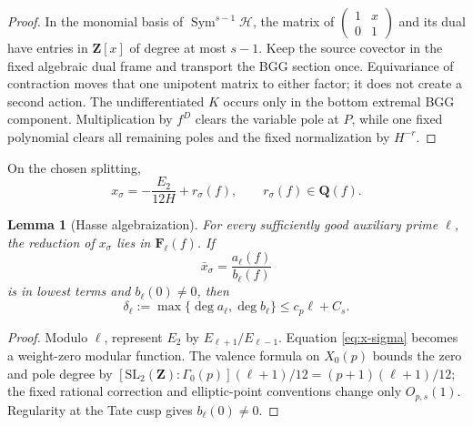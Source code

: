 \documentclass[11pt]{article}
\newtheorem{lemma}[lemma]{Lemma}
\theoremstyle{definition}
\theoremstyle{remark}
\newcommand{\Q}{\mathbf Q}
\newcommand{\Z}{\mathbf Z}
\newcommand{\F}{\mathbf F}
\newcommand{\Sym}{\operatorname{Sym}}
\newcommand{\calH}{\mathcal H}
\begin{document}
\begin{proof}
In the monomial basis of $\Sym^{s-1}\calH$, the matrix of
$\left(\begin{smallmatrix}1&x\\0&1\end{smallmatrix}\right)$ and its dual have
entries in $\Z[x]$ of degree at most $s-1$.  Keep the source covector in the
fixed algebraic dual frame and transport the BGG section once.  Equivariance
of contraction moves that one unipotent matrix to either factor; it does not
create a second action.  The undifferentiated $K$ occurs only in the bottom
extremal BGG component.  Multiplication by $f^D$ clears the variable pole at
$P$, while one fixed polynomial clears all remaining poles and the fixed
normalization by $H^{-r}$.
\end{proof}

On the chosen splitting,
\begin{equation}\label{eq:x-sigma}
 x_\sigma=-\frac{E_2}{12H}+r_\sigma(f),
 \qquad r_\sigma(f)\in\Q(f).
\end{equation}

\begin{lemma}[Hasse algebraization]\label{lem:Hasse-degree}
For every sufficiently good auxiliary prime $\ell$, the reduction of
$x_\sigma$ lies in $\F_\ell(f)$.  If
\[
 \bar x_\sigma=\frac{a_\ell(f)}{b_\ell(f)}
\]
is in lowest terms and $b_\ell(0)\ne0$, then
\begin{equation}\label{eq:Hasse-degree}
 \delta_\ell:=\max\{\deg a_\ell,\deg b_\ell\}
 \le c_p\ell+C_s.
\end{equation}
\end{lemma}

\begin{proof}
Modulo $\ell$, represent $E_2$ by $E_{\ell+1}/E_{\ell-1}$.  Equation
\eqref{eq:x-sigma} becomes a weight-zero modular function.  The valence formula
on $X_0(p)$ bounds the zero and pole degree by
$[\mathrm{SL}_2(\Z):\Gamma_0(p)](\ell+1)/12=(p+1)(\ell+1)/12$; the fixed
rational correction and elliptic-point conventions change only $O_{p,s}(1)$.
Regularity at the Tate cusp gives $b_\ell(0)\ne0$.
\end{proof}
\end{document}
